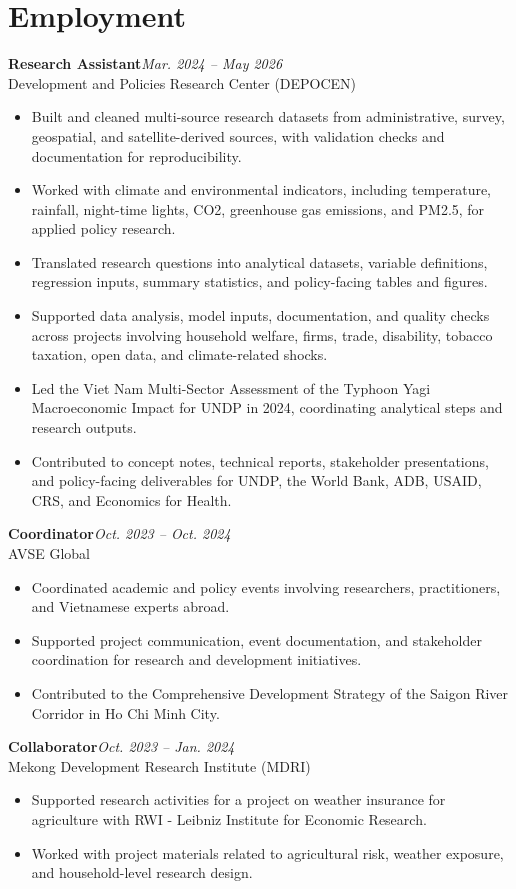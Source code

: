 \documentclass[10pt]{article}
\begin{document}
\section{Employment}
\textbf{Research Assistant}\hfill\emph{Mar. 2024 -- May 2026}\\
Development and Policies Research Center (DEPOCEN)
\begin{itemize}
\item Built and cleaned multi-source research datasets from administrative, survey, geospatial, and satellite-derived sources, with validation checks and documentation for reproducibility.
\item Worked with climate and environmental indicators, including temperature, rainfall, night-time lights, CO2, greenhouse gas emissions, and PM2.5, for applied policy research.
\item Translated research questions into analytical datasets, variable definitions, regression inputs, summary statistics, and policy-facing tables and figures.
\item Supported data analysis, model inputs, documentation, and quality checks across projects involving household welfare, firms, trade, disability, tobacco taxation, open data, and climate-related shocks.
\item Led the Viet Nam Multi-Sector Assessment of the Typhoon Yagi Macroeconomic Impact for UNDP in 2024, coordinating analytical steps and research outputs.
\item Contributed to concept notes, technical reports, stakeholder presentations, and policy-facing deliverables for UNDP, the World Bank, ADB, USAID, CRS, and Economics for Health.
\end{itemize}

\textbf{Coordinator}\hfill\emph{Oct. 2023 -- Oct. 2024}\\
AVSE Global
\begin{itemize}
\item Coordinated academic and policy events involving researchers, practitioners, and Vietnamese experts abroad.
\item Supported project communication, event documentation, and stakeholder coordination for research and development initiatives.
\item Contributed to the Comprehensive Development Strategy of the Saigon River Corridor in Ho Chi Minh City.
\end{itemize}

\textbf{Collaborator}\hfill\emph{Oct. 2023 -- Jan. 2024}\\
Mekong Development Research Institute (MDRI)
\begin{itemize}
\item Supported research activities for a project on weather insurance for agriculture with RWI - Leibniz Institute for Economic Research.
\item Worked with project materials related to agricultural risk, weather exposure, and household-level research design.
\end{itemize}
\end{document}
